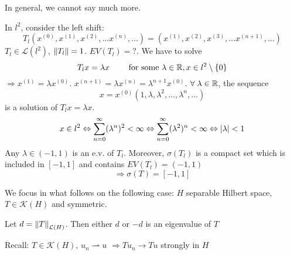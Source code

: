 In general, we cannot say much more.
\begin{example}
    
    In \(l^2\), consider the left shift:
    \[
        T_l(x^{(0)}, x^{(1)}, x^{(2)},... x^{(n)},...) = (x^{(1)}, x^{(2)}, x^{(3)},... x^{(n+1)},...)
    \]
    \(T_l \in \mathcal{L}(l^2)\), \(\norm{T_l}=1\). \(EV(T_l)=?\). We have to solve
    \[
        T_l x = \lambda x \qquad \text{ for some } \lambda \in \mathbb{R}, x \in l^2 \setminus \{0\}
    \]
    \(\Rightarrow x^{(1)}=\lambda x^{(0)}\). \(x^{(n+1)} = \lambda x^{(n)} = \lambda^{n+1} x^{(0)}\). \(\forall \; \lambda \in \mathbb{R}\), the sequence
    \[
        x = x^{(0)} \left(1, \lambda,\lambda^2, ..., \lambda^n, ...\right)
    \]
    is a solution of \(T_l x = \lambda x\).
    \[
        x \in l^2 \Leftrightarrow \sum_{n=0}^\infty (\lambda^n)^2 < \infty \Leftrightarrow \sum_{n=0}^\infty (\lambda^2)^n < \infty \Leftrightarrow \abs{\lambda} < 1
    \]
    Any \(\lambda \in (-1, 1)\) is an e.v. of \(T_l\). Moreover, \(\sigma(T_l)\) is a compact set which is included in \([-1, 1]\) and contains \(EV(T_l) =(-1, 1)\)
    \[
        \Rightarrow \sigma(T) = [-1, 1]
    \]
    
    
\end{example}
We focus in what follows on the following case: \(H\) separable Hilbert space, \(T \in \mathcal{K}(H)\) and symmetric.

\begin{proposition}\label{prop_1_spect}
    Let \(d = \norm{T}_{\mathcal{L}(H)}\). Then either \(d\) or \(-d\) is an eigenvalue of \(T\)
\end{proposition}
Recall: \(T \in \mathcal{K}(H)\), \(u_n \rightharpoonup u\)  \(\Rightarrow T u_n \to Tu\) strongly in \(H\)


